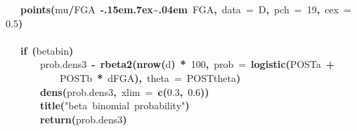 \documentclass{article}
\makeatletter
\newcommand{\hlnumber}[1]{\textcolor[rgb]{0,0,0}{#1}}%
\newcommand{\hlfunctioncall}[1]{\textcolor[rgb]{.5,0,.33}{\textbf{#1}}}%
\newcommand{\hlstring}[1]{\textcolor[rgb]{.6,.6,1}{#1}}%
\newcommand{\hlkeyword}[1]{\textbf{#1}}%
\newcommand{\hlargument}[1]{\textcolor[rgb]{.69,.25,.02}{#1}}%
\newcommand{\hlassignement}[1]{\textbf{#1}}%
\newcommand{\hlsymbol}[1]{#1}%
\def\urltilda{\kern -.15em\lower .7ex\hbox{\~{}}\kern .04em}%
\newcommand{\hlstd}[1]{\textcolor[rgb]{0,0,0}{#1}}%
\newenvironment{kframe}{%
 \def\FrameCommand##1{\hskip\@totalleftmargin \hskip-\fboxsep
 \colorbox{shadecolor}{##1}\hskip-\fboxsep
     \hskip-\linewidth \hskip-\@totalleftmargin \hskip\columnwidth}%
 \MakeFramed {\advance\hsize-\width
   \@totalleftmargin\z@ \linewidth\hsize
   \@setminipage}}%
 {\par\unskip\endMakeFramed}
\newenvironment{knitrout}{}{} %
\makeatother
\begin{document}
\begin{knitrout}
{\begin{kframe}
\begin{flushleft}
\hlstd{}{\ }{\ }{\ }{\ }\hlfunctioncall{points}\hlkeyword{(}\hlsymbol{mu}\hlkeyword{/}\hlsymbol{FGA}{\ }\hlkeyword{\urltilda{}}{\ }\hlsymbol{FGA}\hlkeyword{,}{\ }\hlargument{data}{\ }\hlargument{=}{\ }\hlsymbol{D}\hlkeyword{,}{\ }\hlargument{pch}{\ }\hlargument{=}{\ }\hlnumber{19}\hlkeyword{,}{\ }\hlargument{cex}{\ }\hlargument{=}{\ }\hlnumber{0.5}\hlkeyword{)}\hspace*{\fill}\\
\hlstd{}\hspace*{\fill}\\
\hlstd{}{\ }{\ }{\ }{\ }\hlkeyword{if}{\ }\hlkeyword{(}\hlsymbol{betabin}\hlkeyword{)}{\ }\hlkeyword{\usebox{\hlnormalsizeboxopenbrace}}\hspace*{\fill}\\
\hlstd{}{\ }{\ }{\ }{\ }{\ }{\ }{\ }{\ }\hlsymbol{prob.dens3}{\ }\hlassignement{\usebox{\hlnormalsizeboxlessthan}-}{\ }\hlfunctioncall{rbeta2}\hlkeyword{(}\hlfunctioncall{nrow}\hlkeyword{(}\hlsymbol{d}\hlkeyword{)}{\ }\hlkeyword{*}{\ }\hlnumber{100}\hlkeyword{,}{\ }\hlargument{prob}{\ }\hlargument{=}{\ }\hlfunctioncall{logistic}\hlkeyword{(}\hlsymbol{POST}\hlkeyword{\usebox{\hlnormalsizeboxdollar}}\hlsymbol{a}{\ }\hlkeyword{+}\hspace*{\fill}\\
\hlstd{}{\ }{\ }{\ }{\ }{\ }{\ }{\ }{\ }{\ }{\ }{\ }{\ }\hlsymbol{POST}\hlkeyword{\usebox{\hlnormalsizeboxdollar}}\hlsymbol{b}{\ }\hlkeyword{*}{\ }\hlsymbol{d}\hlkeyword{\usebox{\hlnormalsizeboxdollar}}\hlsymbol{FGA}\hlkeyword{)}\hlkeyword{,}{\ }\hlargument{theta}{\ }\hlargument{=}{\ }\hlsymbol{POST}\hlkeyword{\usebox{\hlnormalsizeboxdollar}}\hlsymbol{theta}\hlkeyword{)}\hspace*{\fill}\\
\hlstd{}{\ }{\ }{\ }{\ }{\ }{\ }{\ }{\ }\hlfunctioncall{dens}\hlkeyword{(}\hlsymbol{prob.dens3}\hlkeyword{,}{\ }\hlargument{xlim}{\ }\hlargument{=}{\ }\hlfunctioncall{c}\hlkeyword{(}\hlnumber{0.3}\hlkeyword{,}{\ }\hlnumber{0.6}\hlkeyword{)}\hlkeyword{)}\hspace*{\fill}\\
\hlstd{}{\ }{\ }{\ }{\ }{\ }{\ }{\ }{\ }\hlfunctioncall{title}\hlkeyword{(}\hlstring{"beta{\ }binomial{\ }probability"}\hlkeyword{)}\hspace*{\fill}\\
\hlstd{}{\ }{\ }{\ }{\ }{\ }{\ }{\ }{\ }\hlfunctioncall{return}\hlkeyword{(}\hlsymbol{prob.dens3}\hlkeyword{)}\hspace*{\fill}\\
\hlstd{}{\ }{\ }{\ }{\ }\hlkeyword{\usebox{\hlnormalsizeboxclosebrace}}\hspace*{\fill}\\

\end{flushleft}
\end{kframe}}
\end{knitrout}
\end{document}
